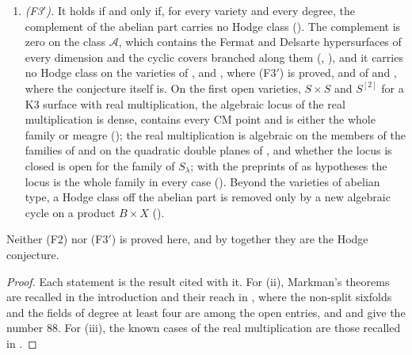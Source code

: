 \begin{theorem}
\begin{enumerate}[label=\textup{(\roman*)},leftmargin=2.6em,itemsep=3pt]
  () and on every member once one Kuga--Satake class is
  algebraic (), or once one complex at one CM point has
  $\Ext^{2}$ of dimension $119$ (). With the
  theorems of the preprints of  as hypotheses, the
  non-split sixfolds and the squares of Mumford fourfolds are settled
  (, ), and the first open cases are
  the eightfolds of nontrivial discriminant and the Weil eightfolds of
  quartic CM fields ().
\item \emph{(F3$'$).} It holds if and only if, for every variety and every
  degree, the complement of the abelian part carries no Hodge class
  (). The complement is zero on the class $\mathcal{A}$,
  which contains the Fermat and Delsarte hypersurfaces of every dimension and
  the cyclic covers branched along them (,
  ), and it carries no Hodge class on the varieties of
  ,  and
  , where \textup{(F3$'$)} is proved, and of
   and , where the conjecture itself
  is.
  On the first open varieties, $S\times S$ and $S^{[2]}$ for a K3 surface
  with real multiplication, the algebraic locus of the real multiplication
  is dense, contains every CM point and is either the whole family or meagre
  (); the real multiplication is algebraic on the members
  of the families of \cite{vGS25} and on the quadratic double planes of
  \cite{Sch10}, and whether the locus is closed is open for the family of
  $S_{\lambda}$; with the preprints of  as hypotheses
  the locus is the whole family in every case (). Beyond the
  varieties of abelian type, a Hodge
  class off the abelian part is removed only by a new algebraic cycle on a
  product $B\times X$ ().
\end{enumerate}
Neither (F2) nor \textup{(F3$'$)} is proved here, and by 
together they are the Hodge conjecture.
\end{theorem}

\begin{proof}
Each statement is the result cited with it. For (ii), Markman's theorems are
recalled in the introduction and their reach in , where the
non-split sixfolds and the fields of degree at least four are among the open
entries, and  and
 give the number $88$. For (iii), the known cases of
the real multiplication are those recalled in .
\end{proof}
